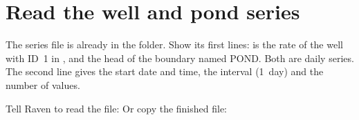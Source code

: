 \section{Read the well and pond series}

The series file is already in the folder. Show its first lines:
\why {} is the rate of the well with ID~1 in , and  the
head of the boundary named POND. Both are daily series. The second line gives the start date and time, the interval
(1~day) and the number of values.

Tell Raven to read the file:
Or copy the finished file: 
